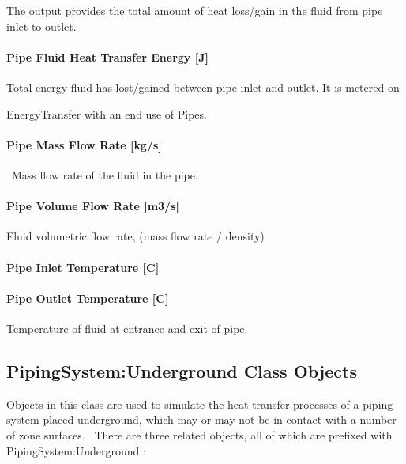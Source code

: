 The output provides the total amount of heat loss/gain in the fluid from pipe inlet to outlet.

\paragraph{Pipe Fluid Heat Transfer Energy {[}J{]}}\label{pipe-fluid-heat-transfer-energy-j-2}

Total energy fluid has lost/gained between pipe inlet and outlet. It is metered on

EnergyTransfer with an end use of Pipes.

\paragraph{Pipe Mass Flow Rate {[}kg/s{]}}\label{pipe-mass-flow-rate-kgs-2}

~Mass flow rate of the fluid in the pipe.

\paragraph{Pipe Volume Flow Rate {[}m3/s{]}}\label{pipe-volume-flow-rate-m3s-2}

Fluid volumetric flow rate, (mass flow rate / density)

\paragraph{Pipe Inlet Temperature {[}C{]}}\label{pipe-inlet-temperature-c-2}

\paragraph{Pipe Outlet Temperature {[}C{]}}\label{pipe-outlet-temperature-c-2}

Temperature of fluid at entrance and exit of pipe.

\subsection{PipingSystem:Underground Class Objects}\label{pipingsystemunderground-class-objects}

Objects in this class are used to simulate the heat transfer processes of a piping system placed underground, which may or may not be in contact with a number of zone surfaces.~ There are three related objects, all of which are prefixed with PipingSystem:Underground :

